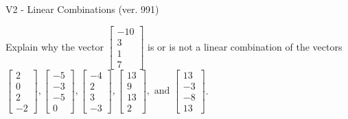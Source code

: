 \begin{exercise}
  \begin{exerciseTitle}V2 - Linear Combinations (ver. 991)\end{exerciseTitle}
  \begin{exerciseStatement}
    Explain why the vector \(\left[\begin{array}{c}
-10 \\
3 \\
1 \\
7
\end{array}\right]\)  is or is not a linear 
	combination of the vectors \(\left[\begin{array}{c}
2 \\
0 \\
2 \\
-2
\end{array}\right] , \left[\begin{array}{c}
-5 \\
-3 \\
-5 \\
0
\end{array}\right] , \left[\begin{array}{c}
-4 \\
2 \\
3 \\
-3
\end{array}\right] , \left[\begin{array}{c}
13 \\
9 \\
13 \\
2
\end{array}\right] , \text{ and } \left[\begin{array}{c}
13 \\
-3 \\
-8 \\
13
\end{array}\right]\).
	



\end{exerciseStatement}
\end{exercise}
